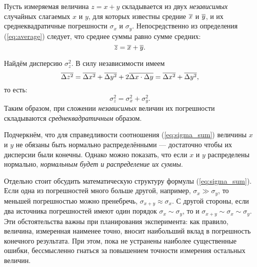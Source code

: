 Пусть измеряемая величина $z=x+y$ складывается из двух \emph{независимых}
случайных слагаемых $x$ и $y$, для которых известны  средние 
$\overline{x}$ и $\overline{y}$, и их среднеквадратичные погрешности
$\sigma_{x}$ и $\sigma_{y}$. Непосредственно из определения (\ref{eq:average})
следует, что среднее суммы равно сумме средних:
\[
    \overline{z}=\overline{x}+\overline{y}.
\]

Найдём дисперсию $\sigma_{z}^{2}$. В силу независимости имеем
\[
    \overline{\Delta z^{2}}=\overline{\Delta x^{2}}+\overline{\Delta
    y^{2}}+2\overline{\Delta x\cdot\Delta y} = \overline{\Delta x^{2}}+
    \overline{\Delta    y^{2}},
\]
то есть:
\begin{equation}
    \label{eq:sigma_sum}
    \sigma_z^2=\sigma_{x}^{2}+\sigma_{y}^{2}.
\end{equation}
Таким образом, при сложении \emph{независимых} величин их погрешности
складываются \emph{среднеквадратичным} образом.

Подчеркнём, что для справедливости соотношения (\ref{eq:sigma_sum})
величины $x$ и $y$ не обязаны быть нормально распределёнными ---
достаточно чтобы их дисперсии были конечны. Однако можно
показать, что если $x$ и $y$ распределены нормально, \emph{нормальным
будет и распределение их суммы}.

\enlargethispage{1em}


Отдельно стоит обсудить математическую структуру формулы (\ref{eq:sigma_sum}).
Если одна из погрешностей много больше другой, например,
$\sigma_{x}\gg\sigma_{y}$,
то меньшей погрешностью можно пренебречь, $\sigma_{x+y}\approx\sigma_{x}$.
С другой стороны, если два источника погрешностей имеют один порядок
$\sigma_{x}\sim\sigma_{y}$, то и $\sigma_{x+y}\sim\sigma_{x}\sim\sigma_{y}$.
Эти обстоятельства важны при планирования эксперимента: как правило,
величина, измеренная наименее точно, вносит наибольший вклад в погрешность
конечного результата. При этом, пока не устранены наиболее существенные
ошибки, бессмысленно гнаться за повышением точности измерения остальных
величин.


